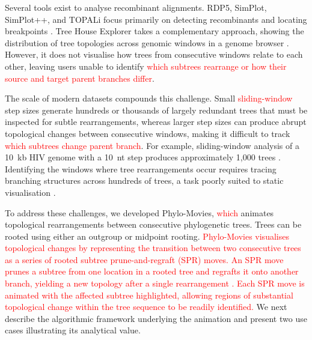 Several tools exist to analyse recombinant alignments. RDP5, SimPlot, SimPlot++, and TOPALi focus primarily on detecting recombinants and locating breakpoints \citep{martin2020, lole1999fulllength-6e0, samson2022simplot-617, Milne2004}. Tree House Explorer takes a complementary approach, showing the distribution of tree topologies across genomic windows in a genome browser \citep{Harris2022THEx}. However, it does not visualise how trees from consecutive windows relate to each other, leaving users unable to identify \textcolor{red}{which subtrees rearrange or how their source and target parent branches differ}.

The scale of modern datasets compounds this challenge. Small \textcolor{red}{sliding-window} step sizes generate hundreds or thousands of largely redundant trees that must be inspected for subtle rearrangements, whereas larger step sizes can produce abrupt topological changes between consecutive windows, making it difficult to track \textcolor{red}{which subtrees change parent branch}. For example, sliding-window analysis of a 10 \,kb HIV genome with a 10 \,nt step produces approximately 1,000 trees \citep{abecasis2007}. Identifying the windows where tree rearrangements occur requires tracing branching structures across hundreds of trees, a task poorly suited to static visualisation \citep{2009_Graham_Kennedy}.

To address these challenges, we developed Phylo-Movies, \textcolor{red}{which} animates topological rearrangements between consecutive phylogenetic trees.  Trees can be rooted using either an outgroup or midpoint rooting. \textcolor{red}{Phylo-Movies visualises topological changes by representing the transition between two consecutive trees as a series of rooted subtree prune-and-regraft (SPR) moves. An SPR move prunes a subtree from one location in a rooted tree and regrafts it onto another branch, yielding a new topology after a single rearrangement \citep{BordewichSemple2005}. Each SPR move is animated with the affected subtree highlighted, allowing regions of substantial topological change within the tree sequence to be readily identified.} We next describe the algorithmic framework underlying the animation and present two use cases illustrating its analytical value.

